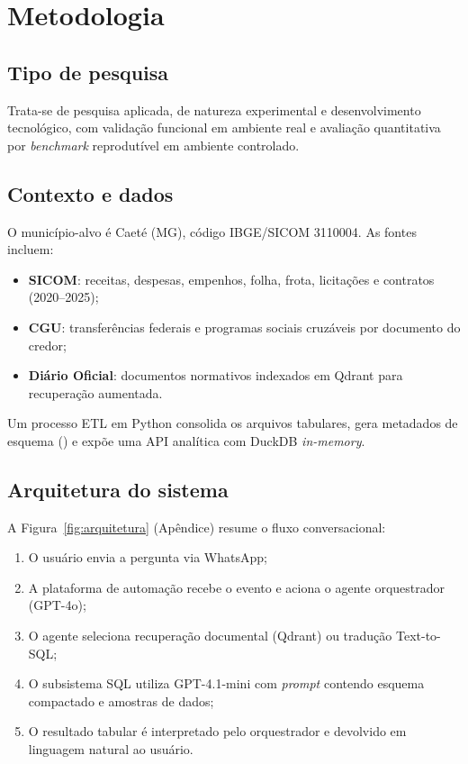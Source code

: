 \chapter{Metodologia}

\section{Tipo de pesquisa}

Trata-se de pesquisa aplicada, de natureza experimental e desenvolvimento tecnológico, com validação funcional em ambiente real e avaliação quantitativa por \textit{benchmark} reprodutível em ambiente controlado.

\section{Contexto e dados}

O município-alvo é Caeté (MG), código IBGE/SICOM 3110004. As fontes incluem:

\begin{itemize}
    \item \textbf{SICOM}: receitas, despesas, empenhos, folha, frota, licitações e contratos (2020--2025);
    \item \textbf{CGU}: transferências federais e programas sociais cruzáveis por documento do credor;
    \item \textbf{Diário Oficial}: documentos normativos indexados em Qdrant para recuperação aumentada.
\end{itemize}

Um processo ETL em Python consolida os arquivos tabulares, gera metadados de esquema () e expõe uma API analítica com DuckDB \textit{in-memory}.

\section{Arquitetura do sistema}

A Figura~\ref{fig:arquitetura} (Apêndice) resume o fluxo conversacional:

\begin{enumerate}
    \item O usuário envia a pergunta via WhatsApp;
    \item A plataforma de automação recebe o evento e aciona o agente orquestrador (GPT-4o);
    \item O agente seleciona recuperação documental (Qdrant) ou tradução Text-to-SQL;
    \item O subsistema SQL utiliza GPT-4.1-mini com \textit{prompt} contendo esquema compactado e amostras de dados;
    \item O resultado tabular é interpretado pelo orquestrador e devolvido em linguagem natural ao usuário.
\end{enumerate}

